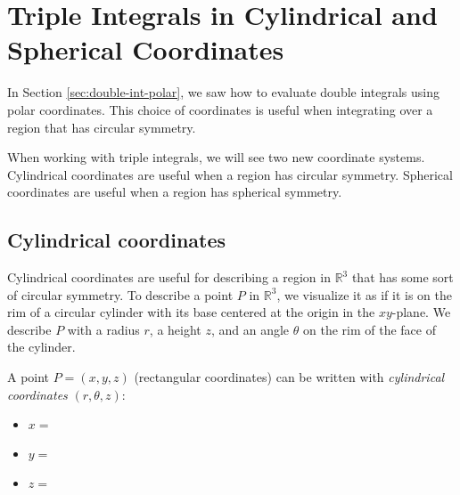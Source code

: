 \newlecture
\setcounter{chapter}{11}
\setcounter{section}{7}

\def\coursetopicnumber{III}
\def\topic{Triple Integrals in Cylindrical and Spherical Coordinates} %
\def\shorttopic{Cylindrical, spherical integration} %
\def\textbookname{Active Calculus} %
\def\shorttextbookname{AC} %
\def\textbooksection{11.8} %
\def\textbooksectionurl{https://activecalculus.org/vector/S-11-8-Triple-Integrals-Cylindrical-Spherical.html} %
\def\handoutday{} %


\thispagestyle{plain}
\topstuff
\section{\topic{} \booklink{}}
\label{sec:triple-spherical-cylindrical}
In Section \ref{sec:double-int-polar}, we saw how to evaluate double integrals using polar coordinates. This choice of coordinates is useful when integrating over a region that has circular symmetry.

When working with triple integrals, we will see two new coordinate systems. Cylindrical coordinates are useful when a region has circular symmetry. Spherical coordinates are useful when a region has spherical symmetry.

\subsection{Cylindrical coordinates}
Cylindrical coordinates are useful for describing a region in $\mathbb{R}^3$ that has some sort of circular symmetry. To describe a point $P$ in $\mathbb{R}^3$, we visualize it as if it is on the rim of a circular cylinder with its base centered at the origin in the $xy$-plane. We describe $P$ with a radius $r$, a height $z$, and an angle $\theta$ on the rim of the face of the cylinder.
\bigskip 

\noindent A point $P=(x,y,z)$ (rectangular coordinates) can be written with \emph{cylindrical coordinates} $(r,\theta,z)$: %
\begin{itemize}
    \item $x=\phantom{r\cos(\theta)}$
    \item $y=\phantom{r\sin(\theta)}$
    \item $z=\phantom{z}$
\end{itemize}

